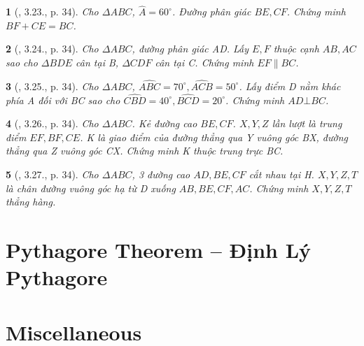 \documentclass{article}
\newtheorem{baitoan}{}
\begin{document}
\begin{baitoan}[\cite{Hung_Mai_Toan_7_hinh_hoc}, 3.23., p. 34]
	Cho $\Delta ABC$, $\widehat{A} = 60^\circ$. Đường phân giác $BE,CF$. Chứng minh $BF + CE = BC$.
\end{baitoan}

\begin{baitoan}[\cite{Hung_Mai_Toan_7_hinh_hoc}, 3.24., p. 34]
	Cho $\Delta ABC$, đường phân giác AD. Lấy $E,F$ thuộc cạnh $AB,AC$ sao cho $\Delta BDE$ cân tại B, $\Delta CDF$ cân tại C. Chứng minh $EF\parallel BC$.
\end{baitoan}

\begin{baitoan}[\cite{Hung_Mai_Toan_7_hinh_hoc}, 3.25., p. 34]
	Cho $\Delta ABC$, $\widehat{ABC} = 70^\circ,\widehat{ACB} = 50^\circ$. Lấy điểm D nằm khác phía A đối với BC sao cho $\widehat{CBD} = 40^\circ,\widehat{BCD} = 20^\circ$. Chứng minh $AD\bot BC$.
\end{baitoan}

\begin{baitoan}[\cite{Hung_Mai_Toan_7_hinh_hoc}, 3.26., p. 34]
	Cho $\Delta ABC$. Kẻ đường cao $BE,CF$. $X,Y,Z$ lần lượt là trung điểm $EF,BF,CE$. K là giao điểm của đường thẳng qua Y vuông góc BX, đường thẳng qua Z vuông góc CX. Chứng minh K thuộc trung trực BC.
\end{baitoan}

\begin{baitoan}[\cite{Hung_Mai_Toan_7_hinh_hoc}, 3.27., p. 34]
	Cho $\Delta ABC$, 3 đường cao $AD,BE,CF$ cắt nhau tại H. $X,Y,Z,T$ là chân đường vuông góc hạ từ D xuống $AB,BE,CF,AC$. Chứng minh $X,Y,Z,T$ thẳng hàng.
\end{baitoan}


\section{Pythagore Theorem -- Định Lý Pythagore}


\section{Miscellaneous}


\printbibliography[heading=bibintoc]
	
\end{document}
